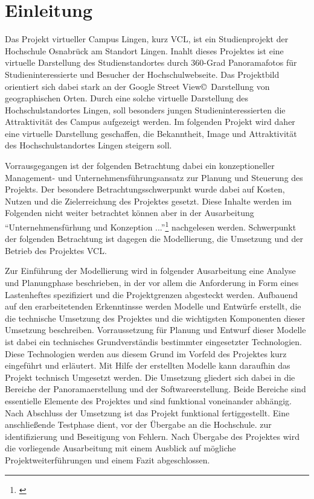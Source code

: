 \section{Einleitung}
\label{sec:Einleitung}

Das Projekt virtueller Campus Lingen, kurz VCL, ist ein Studienprojekt der Hochschule Osnabrück am Standort Lingen. Inahlt dieses Projektes ist eine virtuelle Darstellung des Studienstandortes durch 360-Grad Panoramafotos für Studieninteressierte und Besucher der Hochschulwebseite. Das Projektbild orientiert sich dabei stark an der Google Street View\copyright\ Darstellung von geographischen Orten\footnotemark. Durch eine solche virtuelle Darstellung des Hochschulstandortes Lingen, soll besonders jungen Studieninteressierten die Attraktivität des Campus aufgezeigt werden. Im folgenden Projekt wird daher eine virtuelle Darstellung geschaffen, die Bekanntheit, Image und Attraktivität des Hochschulstandortes Lingen steigern soll.


Vorrausgegangen ist der folgenden Betrachtung dabei ein konzeptioneller Management- und Unternehmensführungsansatz zur Planung und Steuerung des Projekts. Der besondere Betrachtungsschwerpunkt wurde dabei auf Kosten, Nutzen und die Zielerreichung des Projektes gesetzt. Diese Inhalte werden im Folgenden nicht weiter betrachtet können aber in der Ausarbeitung "`Unternehmensfürhung und Konzeption ..."'\footnote{\citet{unternehmensfuehrung2014}} nachgelesen werden. Schwerpunkt der folgenden Betrachtung ist dagegen die Modellierung, die Umsetzung und der Betrieb des Projektes VCL.

Zur Einführung der Modellierung wird in folgender Ausarbeitung eine Analyse und Planungphase beschrieben, in der vor allem die Anforderung in Form eines Lastenheftes spezifiziert und die Projektgrenzen abgesteckt werden. Aufbauend auf den erarbeitetenden Erkenntinsse werden Modelle und Entwürfe erstellt, die die technische Umsetzung des Projektes und die wichtigsten Komponenten dieser Umsetzung beschreiben. Vorraussetzung für Planung und Entwurf dieser Modelle ist dabei ein technisches Grundverständis bestimmter eingesetzter Technologien. Diese Technologien werden aus diesem Grund im Vorfeld des Projektes kurz eingeführt und erläutert. Mit Hilfe der erstellten Modelle kann daraufhin das Projekt technisch Umgesetzt werden. Die Umsetzung gliedert sich dabei in die Bereiche der Panoramaerstellung und der Softwareerstellung. Beide Bereiche sind essentielle Elemente des Projektes und sind funktional voneinander abhängig. Nach Abschluss der Umsetzung ist das Projekt funktional fertiggestellt. Eine anschließende Testphase dient, vor der Übergabe an die Hochschule. zur identifizierung und Beseitigung von Fehlern. Nach Übergabe des Projektes wird die vorliegende Ausarbeitung mit einem Ausblick auf mögliche Projektweiterführungen und einem Fazit abgeschlossen.